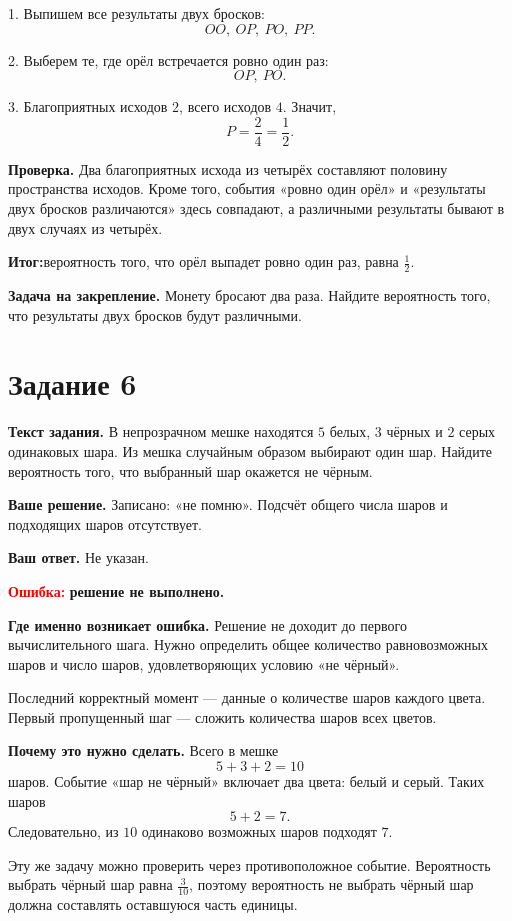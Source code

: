 \documentclass[12pt,a4paper]{article}
\newcommand{\errlabel}[1]{\textcolor{red}{\textbf{Ошибка:}} \textbf{#1}}
\newcommand{\outcome}{\textcolor{teal!60!black}{\textbf{Итог:}}}
\begin{document}
1. Выпишем все результаты двух бросков:
\[
OO,\ OP,\ PO,\ PP.
\]

2. Выберем те, где орёл встречается ровно один раз:
\[
OP,\ PO.
\]

3. Благоприятных исходов $2$, всего исходов $4$. Значит,
\[
P=\frac24=\frac12.
\]

\textbf{Проверка.}
Два благоприятных исхода из четырёх составляют половину пространства исходов. Кроме того, события «ровно один орёл» и «результаты двух бросков различаются» здесь совпадают, а различными результаты бывают в двух случаях из четырёх.

\outcome вероятность того, что орёл выпадет ровно один раз, равна $\frac12$.

\textbf{Задача на закрепление.}
Монету бросают два раза. Найдите вероятность того, что результаты двух бросков будут различными.

\newpage
{}\label{task:6}
\section*{Задание 6}

\textbf{Текст задания.}
В непрозрачном мешке находятся $5$ белых, $3$ чёрных и $2$ серых одинаковых шара. Из мешка случайным образом выбирают один шар. Найдите вероятность того, что выбранный шар окажется не чёрным.

\textbf{Ваше решение.}
Записано: «не помню». Подсчёт общего числа шаров и подходящих шаров отсутствует.

\textbf{Ваш ответ.}
Не указан.

\errlabel{решение не выполнено.}

\textbf{Где именно возникает ошибка.}
Решение не доходит до первого вычислительного шага. Нужно определить общее количество равновозможных шаров и число шаров, удовлетворяющих условию «не чёрный».

Последний корректный момент --- данные о количестве шаров каждого цвета. Первый пропущенный шаг --- сложить количества шаров всех цветов.

\textbf{Почему это нужно сделать.}
Всего в мешке
\[
5+3+2=10
\]
шаров. Событие «шар не чёрный» включает два цвета: белый и серый. Таких шаров
\[
5+2=7.
\]
Следовательно, из $10$ одинаково возможных шаров подходят $7$.

Эту же задачу можно проверить через противоположное событие. Вероятность выбрать чёрный шар равна $\frac3{10}$, поэтому вероятность не выбрать чёрный шар должна составлять оставшуюся часть единицы.
\end{document}
